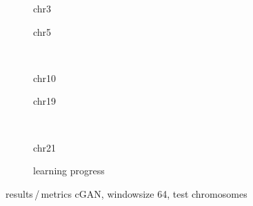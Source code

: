 \begin{figure}[p]
    \begin{subfigure}{0.45\textwidth}
        \scriptsize
        \caption{chr3}
    \end{subfigure} \hfill
    \begin{subfigure}{0.45\textwidth}
        \scriptsize
        \caption{chr5}
    \end{subfigure}\\[5mm]
    \begin{subfigure}{0.45\textwidth}
        \scriptsize
        \caption{chr10}
    \end{subfigure}\hfill
    \begin{subfigure}{0.45\textwidth}
        \scriptsize
        \caption{chr19}
    \end{subfigure}\\[3mm]
    \begin{subfigure}{0.45\textwidth}
        \scriptsize
        \caption{chr21}
    \end{subfigure} \hfill
    \begin{subfigure}{0.45\textwidth}
        \scriptsize
        \caption{learning progress} \label{fig:results:GAN64_lossEpochs}
    \end{subfigure}
    \caption{results\,/\,metrics cGAN, windowsize 64, test chromosomes}   \label{fig:results:GAN64_pearson}
\end{figure}


